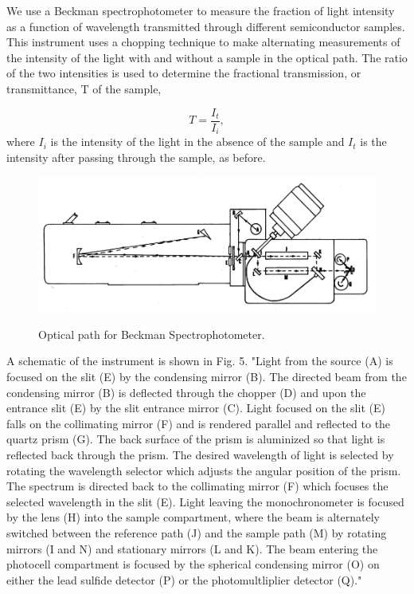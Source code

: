 \documentclass{article}
\begin{document}
We use a Beckman spectrophotometer to measure the fraction of light intensity as a function of wavelength transmitted through different semiconductor samples. This instrument uses a chopping technique to make alternating measurements of the intensity of the light with and without a sample in the optical path. The ratio of the two intensities is used to determine the fractional transmission, or transmittance, T of the sample,

\begin{equation}
	T = \frac{I_t}{I_i},
\end{equation}
where $I_i$ is the intensity of the light in the absence of the sample and $I_t$ is the intensity after passing through the sample, as before.

\begin{figure}[!htb]
	\centering
	\includegraphics[scale=1.]{plots/fig_8.png}
 	\label{beckman}
	\caption{Optical path for Beckman Spectrophotometer.\cite{lab manual}}
\end{figure}

A schematic of the instrument is shown in Fig. 5. "Light from the source (A) is focused on the slit (E) by the condensing mirror (B). The directed beam from the condensing mirror (B) is deflected through the chopper (D) and upon the entrance slit (E) by the slit entrance mirror (C). Light focused on the slit (E) falls on the collimating mirror (F) and is rendered parallel and reflected to the quartz prism (G). The back surface of the prism is aluminized so that light is reflected back through the prism. The desired wavelength of light is selected by rotating the wavelength selector which adjusts the angular position of the prism. The spectrum is directed back to the collimating mirror (F) which focuses the selected wavelength in the slit (E). Light leaving the monochronometer is focused by the lens (H) into the sample compartment, where the beam is alternately switched between the reference path (J) and the sample path (M) by rotating mirrors (I and N) and stationary mirrors (L and K). The beam entering the photocell compartment is focused by the spherical condensing mirror (O) on either the lead sulfide detector (P) or the photomultliplier detector (Q)."\cite{lab manual}
\end{document}
